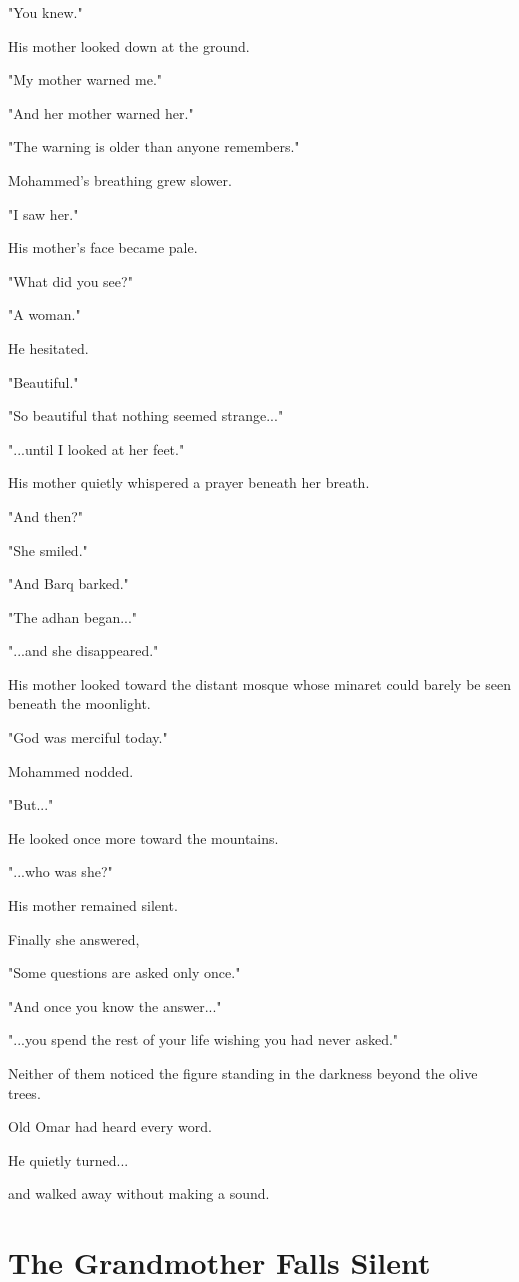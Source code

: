 \documentclass[12pt,openany]{book}
\begin{document}
"You knew."

His mother looked down at the ground.

"My mother warned me."

"And her mother warned her."

"The warning is older than anyone remembers."

Mohammed's breathing grew slower.

"I saw her."

His mother's face became pale.

"What did you see?"

"A woman."

He hesitated.

"Beautiful."

"So beautiful that nothing seemed strange..."

"...until I looked at her feet."

His mother quietly whispered a prayer beneath her breath.

"And then?"

"She smiled."

"And Barq barked."

"The adhan began..."

"...and she disappeared."

His mother looked toward the distant mosque whose minaret could barely be seen beneath the moonlight.

"God was merciful today."

Mohammed nodded.

"But..."

He looked once more toward the mountains.

"...who was she?"

His mother remained silent.

Finally she answered,

"Some questions are asked only once."

"And once you know the answer..."

"...you spend the rest of your life wishing you had never asked."

Neither of them noticed the figure standing in the darkness beyond the olive trees.

Old Omar had heard every word.

He quietly turned...

and walked away without making a sound.
\section*{The Grandmother Falls Silent}
\end{document}
